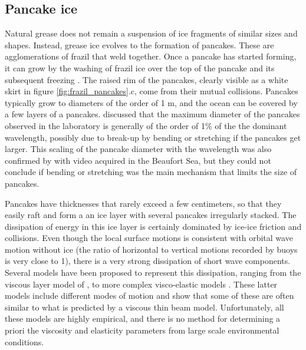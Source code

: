 \subsection{Pancake ice}
Natural grease does not remain a suspension of ice fragments of similar sizes and shapes. Instead, grease ice evolves to the formation of pancakes. These are agglomerations of frazil that weld together. Once a pancake has started forming, it can grow by the washing of frazil ice over the top of the pancake and its subsequent freezing \citep{Doble&al.2003}. The raised rim of the pancakes, clearly visible as a white skirt in figure \ref{fig:frazil_pancakes}.c, come from their mutual collisions. Pancakes typically grow to diameters of the order of 1 m, and the ocean can be covered by a few layers of a pancakes. \cite{Shen&al.2001} discussed that the maximum diameter of the pancakes observed in the laboratory is generally of the order of 1\% of the  the dominant wavelength, possibly due to break-up by bending or stretching if the pancakes get larger. This scaling of the pancake diameter with the wavelength was also confirmed by \cite{Roach&al.2018} with video acquired in the Beaufort Sea, but they could not conclude if bending or stretching was the main mechanism that limits the size of pancakes. 

Pancakes have thicknesses that rarely exceed a few centimeters, so that they easily raft and form a an ice layer with several pancakes irregularly stacked. The dissipation of energy in this ice layer is certainly dominated by ice-ice friction and collisions. Even though the local surface motions is consistent with orbital wave motion without ice (the ratio of horizontal to vertical motions recorded by buoys is very close to 1), there is a very strong dissipation of short wave components. Several models have been proposed to represent this dissipation, ranging from the viscous layer model of \cite{Keller1998}, to more complex visco-elastic models \citep{Wang&Shen2010,Rogers&al.2016}. These latter models include different modes of motion and \cite{Mosig&al.2015} show that some of these are often similar to what is predicted by a viscous thin beam model. Unfortunately, all these models are highly empirical, and there is no method for determining a priori the viscosity and elasticity parameters from large scale environmental conditions. 

